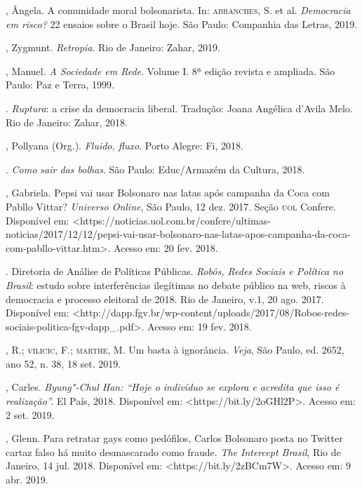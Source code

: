 \begin{bibliohedra}
, Ângela. A comunidade moral bolsonarista. In: \textsc{abranches}, S. et
al. \emph{Democracia em risco?} 22 ensaios sobre o Brasil hoje. São
Paulo: Companhia das Letras, 2019.

, Zygmunt. \emph{Retropia}. Rio de Janeiro: Zahar, 2019.

, Manuel. \emph{A Sociedade em Rede}. Volume I. 8ª edição
revista e ampliada. São Paulo: Paz e Terra, 1999.

\titidem. \emph{Ruptura}: a crise da democracia liberal.
Tradução: Joana Angélica d'Avila Melo. Rio de Janeiro: Zahar, 2018.

, Pollyana (Org.). \emph{Fluido, fluxo}. Porto Alegre: Fi, 2018.

\titidem. \emph{Como sair das bolhas}. São Paulo: Educ/Armazém
da Cultura, 2018.

, Gabriela. Pepsi vai usar Bolsonaro nas latas após campanha da
Coca com Pabllo Vittar? \emph{Universo Online}, São Paulo, 12 dez. 2017.
Seção \textsc{uol} Confere. Disponível em:
\textless{}https://noticias.uol.com.br/confere/ultimas-noticias/2017/12/12/pepsi-vai-usar-bolsonaro-nas-latas-apos-campanha-da-coca-com-pabllo-vittar.htm\textgreater{}.
Acesso em: 20 fev. 2018.

. Diretoria de Análise de Políticas Públicas.
\emph{Robôs, Redes Sociais e Política no Brasil}: estudo sobre
interferências ilegítimas no debate público na web, riscos à democracia
e processo eleitoral de 2018. Rio de Janeiro, v.1, 20 ago. 2017.
Disponível em:
\textless{}http://dapp.fgv.br/wp-content/uploads/2017/08/Robos-redes-sociais-politica-fgv-dapp\_.pdf\textgreater{}.
Acesso em: 19 fev. 2018.

, R.; \textsc{vilicic}, F.; \textsc{marthe}, M. Um basta à ignorância. \emph{Veja},
São Paulo, ed. 2652, ano 52, n. 38, 18 set. 2019.

, Carles. \emph{Byung"-Chul Han: ``Hoje o indivíduo se explora e
acredita que isso é realização''.} El País, 2018. Disponível em:
\textless{}https://bit.ly/2oGHl2P\textgreater{}.
Acesso em: 2 set. 2019.

, Glenn. Para retratar gays como pedófilos, Carlos Bolsonaro
posta no Twitter cartaz falso há muito desmascarado como fraude.
\emph{The Intercept Brasil}, Rio de Janeiro, 14 jul. 2018. Disponível
em:
\textless{}https://bit.ly/2zBCm7W\textgreater{}.
Acesso em: 9 abr. 2019.


\end{bibliohedra}

